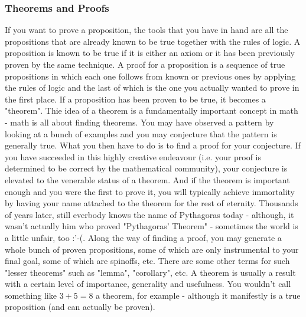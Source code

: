 \subsubsection{Theorems and Proofs}
If you want to prove a proposition, the tools that you have in hand are all the propositions that are already known to be true together with the rules of logic. A proposition is known to be true if it is either an axiom or it has been previously proven by the same technique. A proof for a proposition is a sequence of true propositions in which each one follows from known or previous ones by applying the rules of logic and the last of which is the one you actually wanted to prove in the first place. If a proposition has been proven to be true, it becomes a "theorem". Thie idea of a theorem is a fundamentally important concept in math - math is all about finding theorems. You may have observed a pattern by looking at a bunch of examples and you may conjecture that the pattern is generally true. What you then have to do is to find a proof for your conjecture. If you have succeeded in this highly creative endeavour (i.e. your proof is determined to be correct by the mathematical community), your conjecture is elevated to the venerable status of a theorem. And if the theorem is important enough and you were the first to prove it, you will typically achieve immortality by having your name attached to the theorem for the rest of eternity. Thousands of years later, still everbody knows the name of Pythagoras today - although, it wasn't actually him who proved "Pythagoras' Theorem" - sometimes the world is a little unfair, too :'-(. Along the way of finding a proof, you may generate a whole bunch of proven propositions, some of which are only instrumental to your final goal, some of which are spinoffs, etc. There are some other terms for such "lesser theorems" such as "lemma", "corollary", etc. A theorem is usually a result with a certain level of importance, generality and usefulness. You wouldn't call something like $3+5=8$ a theorem, for example - although it manifestly is a true proposition (and can actually be proven).

